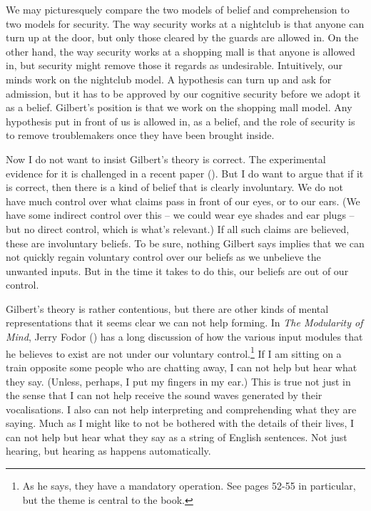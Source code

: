 \documentclass[
  11pt,
  letterpaper,
  DIV=11,
  numbers=noendperiod,
  twoside]{scrartcl}
\begin{document}
We may picturesquely compare the two models of belief and comprehension
to two models for security. The way security works at a nightclub is
that anyone can turn up at the door, but only those cleared by the
guards are allowed in. On the other hand, the way security works at a
shopping mall is that anyone is allowed in, but security might remove
those it regards as undesirable. Intuitively, our minds work on the
nightclub model. A hypothesis can turn up and ask for admission, but it
has to be approved by our cognitive security before we adopt it as a
belief. Gilbert's position is that we work on the shopping mall model.
Any hypothesis put in front of us is allowed in, as a belief, and the
role of security is to remove troublemakers once they have been brought
inside.

Now I do not want to insist Gilbert's theory is correct. The
experimental evidence for it is challenged in a recent paper
(). But I do want to argue that if it is correct, then there is a
kind of belief that is clearly involuntary. We do not have much control
over what claims pass in front of our eyes, or to our ears. (We have
some indirect control over this -- we could wear eye shades and ear
plugs -- but no direct control, which is what's relevant.) If all such
claims are believed, these are involuntary beliefs. To be sure, nothing
Gilbert says implies that we can not quickly regain voluntary control
over our beliefs as we unbelieve the unwanted inputs. But in the time it
takes to do this, our beliefs are out of our control.

Gilbert's theory is rather contentious, but there are other kinds of
mental representations that it seems clear we can not help forming. In
\emph{The Modularity of Mind}, Jerry Fodor
() has a long discussion of how the
various input modules that he believes to exist are not under our
voluntary control.\footnote{As he says, they have a mandatory operation.
  See pages 52-55 in particular, but the theme is central to the book.}
If I am sitting on a train opposite some people who are chatting away, I
can not help but hear what they say. (Unless, perhaps, I put my fingers
in my ear.) This is true not just in the sense that I can not help
receive the sound waves generated by their vocalisations. I also can not
help interpreting and comprehending what they are saying. Much as I
might like to not be bothered with the details of their lives, I can not
help but hear what they say as a string of English sentences. Not just
hearing, but hearing as happens automatically.
\end{document}

